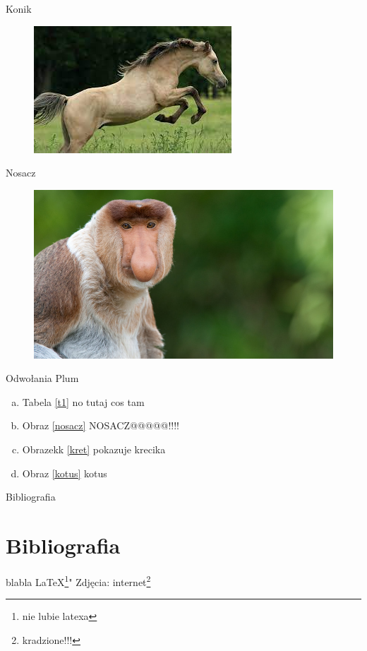 \documentclass{beamer}
\begin{document}
\begin{frame}{Konik}
\begin{figure}[h!]
\includegraphics[scale=0.5]{konik.jpg}
\end{figure}
\end{frame}

\begin{frame}{Nosacz}
\begin{figure}[h!]
\includegraphics[scale=0.5]{nosacz.jpg}
\end{figure}
\end{frame}

\begin{frame}{Odwołania}
Plum \cite{Miotk}
\begin{enumerate}[a)]
\item Tabela \ref{t1} no tutaj cos tam 
\pause
\item Obraz \ref{nosacz} NOSACZ@@@@@!!!!
\pause
\item Obrazekk  \ref{kret} pokazuje krecika
\pause
\item Obraz \ref{kotus} kotus
\end{enumerate}
\end{frame}

\begin{frame}{Bibliografia}
\section{Bibliografia}\label{bb}
\begin{thebibliography}{2}
blabla \LaTeX \footnote[1]{nie lubie latexa}"
Zdjęcia: internet\footnote[2]{kradzione!!!}
\end{thebibliography}
\end{frame}
\end{document}
